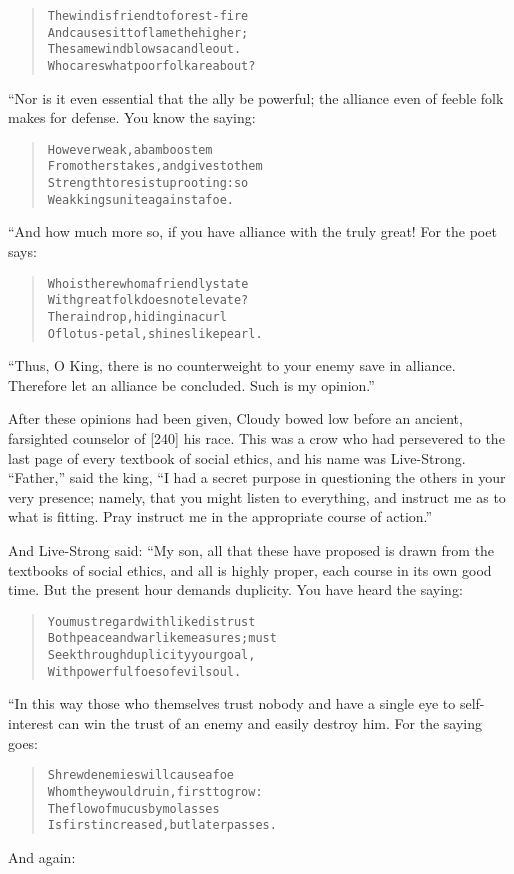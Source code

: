 \documentclass[article, twoside, 14pt]{memoir}
\renewenvironment{verbatim}{%
\begin{quote}%
\vskip -10pt%
\begin{alltt}\normalfont\large}{\end{alltt}%
\end{quote}%
\vskip -10pt
} %
\begin{document}
\begin{verbatim}
The wind is friend to forest-fire
And causes it to flame the higher;
The same wind blows a candle out.
Who cares what poor folk are about?
\end{verbatim}
“Nor is it even essential that the ally be powerful; the alliance
even of feeble folk makes for defense. You know the saying:

\begin{verbatim}
However weak, a bamboo stem
From others takes, and gives to them
Strength to resist uprooting: so
Weak kings unite against a foe.
\end{verbatim}
“And how much more so, if you have alliance with the truly great!
For the poet says:

\begin{verbatim}
Who is there whom a friendly state
With great folk does not elevate?
The raindrop, hiding in a curl
Of lotus-petal, shines like pearl.
\end{verbatim}
``Thus, O King, there is no counterweight to your enemy save in alliance. Therefore let an alliance be concluded. Such is my opinion.''

After these opinions had been given, Cloudy bowed low before an
ancient, farsighted counselor of [240] his race. This was a crow
who had persevered to the last page of every textbook of social
ethics, and his name was Live-Strong. ``Father,'' said the king,
``I had a secret purpose in questioning the others in your very presence; namely, that you might listen to everything, and instruct me as to what is fitting. Pray instruct me in the appropriate course of action.''

And Live-Strong said: “My son, all that these have proposed is
drawn from the textbooks of social ethics, and all is highly
proper, each course in its own good time. But the present hour
demands duplicity. You have heard the saying:

\begin{verbatim}
You must regard with like distrust
Both peace and warlike measures; must
Seek through duplicity your goal,
With powerful foes of evil soul.
\end{verbatim}
“In this way those who themselves trust nobody and have a single
eye to self-interest can win the trust of an enemy and easily
destroy him. For the saying goes:

\begin{verbatim}
Shrewd enemies will cause a foe
Whom they would ruin, first to grow:
The flow of mucus by molasses
Is first increased, but later passes.
\end{verbatim}
And again:
\end{document}
